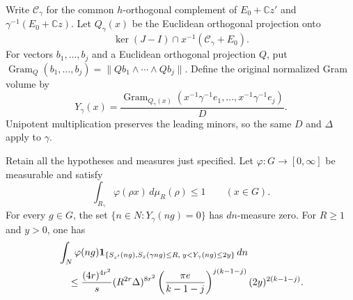 Write $\mathcal C_\gamma$ for the common $h$-orthogonal
complement of $E_0+\mathbb Cz'$ and
$\gamma^{-1}(E_0+\mathbb Cz)$.  Let $Q_\gamma(x)$ be the
Euclidean orthogonal projection onto
\[
       \ker(J-I)\cap x^{-1}(\mathcal C_\gamma+E_0).
\]
For vectors $b_1,\ldots,b_j$ and a Euclidean orthogonal
projection $Q$, put
$\operatorname{Gram}_Q(b_1,\ldots,b_j)
 =\|Qb_1\wedge\cdots\wedge Qb_j\|$.  Define the original
normalized Gram volume by
\[
 Y_\gamma(x)=\frac{
    \operatorname{Gram}_{Q_\gamma(x)}
       (x^{-1}\gamma^{-1}e_1,\ldots,x^{-1}\gamma^{-1}e_j)}D.
\]
Unipotent multiplication preserves the leading minors, so the
same $D$ and $\Delta$ apply to $\gamma$.

\begin{theorem}
\label{thm:original-degenerate-fibre-estimate}
Retain all the hypotheses and measures just specified.  Let
$\varphi:G\to[0,\infty]$ be measurable and satisfy
\[
       \int_{R_\gamma}\varphi(\rho x)\,d\mu_R(\rho)
                           \le1\qquad(x\in G).
\]
For every $g\in G$, the set
$\{n\in N:Y_\gamma(ng)=0\}$ has $dn$-measure zero.
For $R\ge1$ and $y>0$, one has
\begin{align}
 &\int_N\varphi(ng)
    {\bf1}_{\{S_{z'}(ng),S_z(\gamma ng)\le R,\;
                         y<Y_\gamma(ng)\le2y\}}\,dn \notag\\
 &\quad\le\frac{(4r)^{4r^2}}s
       (R^{2r}\Delta)^{8r^2}
       \left(\frac{\pi e}{k-1-j}\right)^{j(k-1-j)}
                         (2y)^{2(k-1-j)}.
 \label{eq:original-degenerate-fibre-estimate}
\end{align}
\end{theorem}


